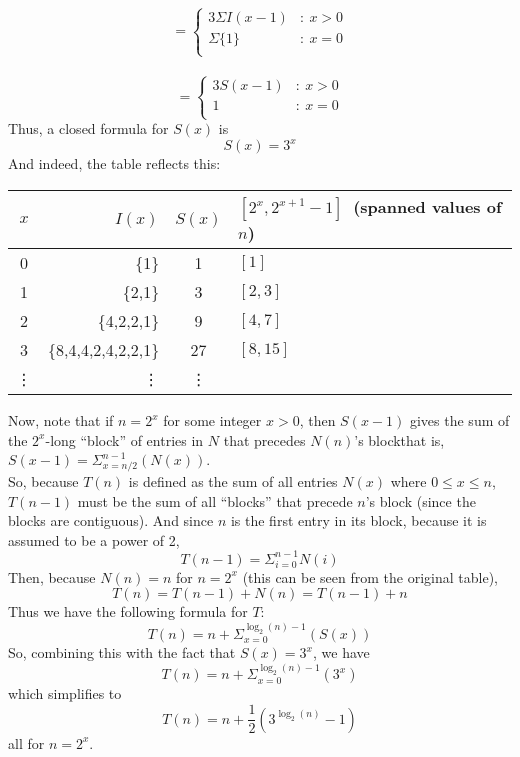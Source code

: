 \documentclass[a4paper]{article}
\begin{document}
\\
\begin{displaymath}
=\left\{
\begin{array}{lr}
3\Sigma I(x-1)&:~x>0\\
\Sigma\{1\}&:~x=0\\
\end{array}
\end{displaymath}
\\
\begin{displaymath}
=\left\{
\begin{array}{lr}
3S(x-1)&:~x>0\\
1&:~x=0\\
\end{array}
\end{displaymath}
Thus, a closed formula for $S(x)$ is
	$$S(x)=3^x$$
And indeed, the table reflects this:
\begin{center}
\begin{tabular}{ c | r | c | l }
$x$&$I(x)$&$S(x)$&$[2^x,2^{x+1}-1]$~(spanned values of $n$)\\
\hline
0&\{1\}&1&$[1]$\\
1&\{2,1\}&3&$[2,3]$\\
2&\{4,2,2,1\}&9&$[4,7]$\\
3&\{8,4,4,2,4,2,2,1\}&27&$[8,15]$\\
\vdots&\vdots&\vdots\\
\end{tabular}
\end{center}
Now, note that if $n=2^x$ for some integer $x>0$, then $S(x-1)$ gives the sum of the $2^x$-long ``block'' of entries in $N$ that precedes $N(n)$'s block\textemdash that is, $S(x-1)=\Sigma_{x=n/2}^{n-1}(N(x))$.\\
So, because $T(n)$ is defined as the sum of all entries $N(x)$ where $0\leq x \leq n$, $T(n-1)$ must be the sum of all ``blocks'' that precede $n$'s block (since the blocks are contiguous). And since $n$ is the first entry in its block, because it is assumed to be a power of 2,
$$T(n-1)=\Sigma_{i=0}^{n-1} N(i)$$
Then, because $N(n)=n$ for $n=2^x$ (this can be seen from the original table),
$$T(n)=T(n-1)+N(n)=T(n-1)+n$$
Thus we have the following formula for $T$:
$$T(n)=n+\Sigma_{x=0}^{\log_2(n)-1}(S(x))$$
So, combining this with the fact that $S(x)=3^x$, we have
$$T(n)=n+\Sigma_{x=0}^{\log_2(n)-1}(3^x)$$
which simplifies to
$$T(n)=n+\frac{1}{2}(3^{\log_2(n)}-1)$$
all for $n=2^x$.
\end{document}
